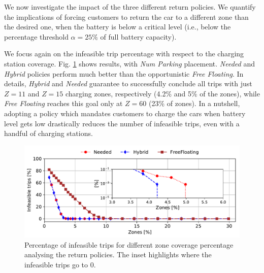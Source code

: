 We now investigate the impact of the three different return policies. We quantify the implications of forcing customers to return the car to a different zone than the desired one, when the battery is below a critical level (i.e., below the percentage threshold $\alpha=25\%$ of full battery capacity).

We focus again on the infeasible trip percentage with respect to the charging station coverage.
Fig. \ref{fig:deathsVsZones_policy} shows results, with \textit{Num Parking} placement. \textit{Needed} and \textit{Hybrid} policies perform much better than the opportunistic \textit{Free Floating}.
In details, \textit{Hybrid} and \textit{Needed} guarantee to successfully conclude all trips with just $Z=11$ and $Z=15$ charging zones, respectively (4.2\% and 5\% of the zones), while \textit{Free Floating} reaches this goal only at $Z=60$  (23\% of zones).
In a nutshell, adopting a policy which mandates customers to charge the cars when battery level gets low drastically reduces the number of infeasible trips, even with a handful of  charging stations.

\begin{figure}[ht]
	\centering
	\includegraphics[width=0.95\columnwidth]{figures/Torino_H_N_FF_deaths_probs.pdf}
	\caption{Percentage of infeasible trips for different zone coverage percentage analysing the return policies. The inset highlights where the infeasible trips go to 0.}
	\label{fig:deathsVsZones_policy}
\end{figure}

